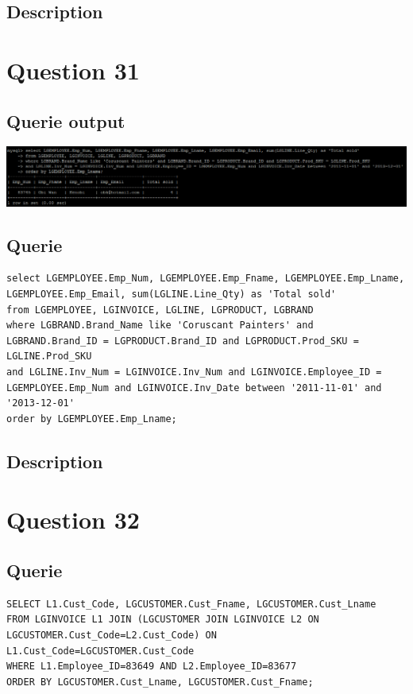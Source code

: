 \documentclass[a4paper,10pt]{article}
\begin{document}
\subsection{Description}\section*{Question 31}
\subsection{Querie output}
           \includegraphics{Queries/Question_31/Question_31_screenshot.PNG}
 \subsection{Querie}
          \lstset{
            language=SQL,
            breaklines=true
            }
        \begin{lstlisting}[frame=single]
        select LGEMPLOYEE.Emp_Num, LGEMPLOYEE.Emp_Fname, LGEMPLOYEE.Emp_Lname, LGEMPLOYEE.Emp_Email, sum(LGLINE.Line_Qty) as 'Total sold' 
from LGEMPLOYEE, LGINVOICE, LGLINE, LGPRODUCT, LGBRAND 
where LGBRAND.Brand_Name like 'Coruscant Painters' and LGBRAND.Brand_ID = LGPRODUCT.Brand_ID and LGPRODUCT.Prod_SKU = LGLINE.Prod_SKU 
and LGLINE.Inv_Num = LGINVOICE.Inv_Num and LGINVOICE.Employee_ID = LGEMPLOYEE.Emp_Num and LGINVOICE.Inv_Date between '2011-11-01' and '2013-12-01' 
order by LGEMPLOYEE.Emp_Lname;
        \end{lstlisting}
\subsection{Description}\section*{Question 32}
 \subsection{Querie}
          \lstset{
            language=SQL,
            breaklines=true
            }
        \begin{lstlisting}[frame=single]
        SELECT L1.Cust_Code, LGCUSTOMER.Cust_Fname, LGCUSTOMER.Cust_Lname
FROM LGINVOICE L1 JOIN (LGCUSTOMER JOIN LGINVOICE L2 ON LGCUSTOMER.Cust_Code=L2.Cust_Code) ON L1.Cust_Code=LGCUSTOMER.Cust_Code
WHERE L1.Employee_ID=83649 AND L2.Employee_ID=83677
ORDER BY LGCUSTOMER.Cust_Lname, LGCUSTOMER.Cust_Fname;

        \end{lstlisting}
\end{document}
